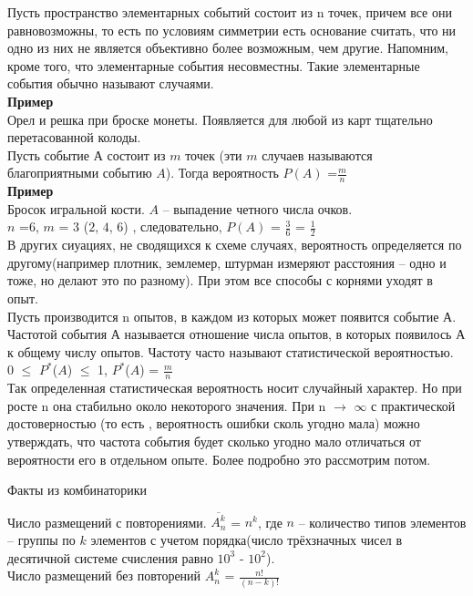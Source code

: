 \documentclass[russian, 12pt, fleqn,x11names]{article}
\begin{document}
Пусть  пространство элементарных событий состоит из n точек, причем все они равновозможны, то есть  по условиям симметрии есть основание считать, что ни одно из них не является объективно более возможным, чем другие. Напомним, кроме того, что элементарные  события  
несовместны. Такие элементарные события обычно называют случаями.\\
\textbf{Пример}\\Орел и решка при броске монеты. Появляется для любой  из карт тщательно перетасованной колоды.\\
Пусть событие $А$ состоит из $m$ точек (эти $m$ случаев называются благоприятными событию $A$). Тогда вероятность $P(A)$  =$\frac{m}{n}$\\
\textbf{Пример}\\Бросок игральной кости. $A$  -- выпадение четного числа очков.\\$n$ =$6$, $m$ = $3$ ($2$, $4$, $6$) , следовательно, $P(A)$ = $\frac{3}{6}$ = $\frac{1}{2}$ \\
В других сиуациях, не сводящихся к схеме случаях, вероятность определяется по другому(например плотник, землемер, штурман измеряют расстояния -- одно и тоже, но делают это по разному). При этом все способы 
с корнями уходят в опыт.\\
Пусть производится n опытов, в каждом из которых может появится событие $А$. Частотой события $А$ называется отношение числа опытов, в которых появилось $А$ к общему числу опытов. Частоту часто называют статистической вероятностью.\\ 
 $0$ $\leq$ $P^*$($A$) $\leq$ 1, $P^*$($A$) = $\frac{m}{n}$\\
Так определенная статистическая вероятность носит случайный характер. Но при росте n она стабильно около некоторого значения. При n  $\rightarrow$  $\infty$ с практической достоверностью (то есть , вероятность ошибки сколь угодно мала) можно утверждать, что частота события будет сколько угодно мало отличаться от вероятности его в отдельном опыте. Более подробно это рассмотрим потом.\\
\begin{center}
$\textbf{Факты из комбинаторики}$
\end{center}
Число размещений с повторениями. $\overline{A^k_n}$ = $n^k$, 
где $n$ -- количество типов элементов -- группы по $k$ элементов с учетом порядка(число трёхзначных чисел в десятичной системе счисления равно $10^3$ - $10^2$).\\
Число размещений без повторений $A^k_n$ = $\frac{n!}{(n-k)!}$\\
\end{document}

